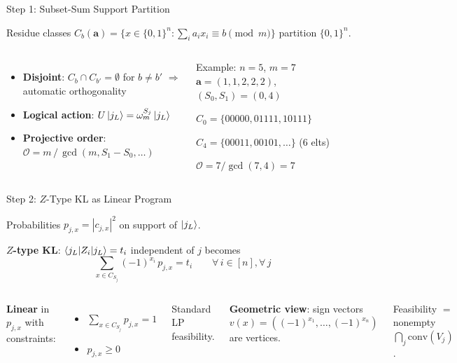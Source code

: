 \documentclass[aspectratio=169,t,10pt]{beamer}
\newcommand{\Fintwo}{\{0,1\}}
\begin{document}
\begin{frame}{Step 1: Subset-Sum Support Partition}

Residue classes
$C_b(\mathbf{a})
  = 
  \bigl\{x\in\Fintwo^n :
    \sum_i a_i x_i \equiv b \pmod{m}\bigr\}$
partition $\Fintwo^n$.

\begin{columns}[T]
\begin{itemize}
\item \textbf{Disjoint}: $C_b\cap C_{b'} = \emptyset$ for $b\neq b'$
  $ \Rightarrow$ automatic orthogonality
\item \textbf{Logical action}:
  $U\ket{j_L} = \omega_m^{S_j}\ket{j_L}$
\item \textbf{Projective order}:
  $\mathcal{O} = m\,/\,\gcd(m,S_1-S_0,\ldots)$
\end{itemize}

\begin{exampleblock}{Example: $n{=}5$, $m{=}7$}
$\mathbf{a}{=}(1,1,2,2,2)$, $(S_0,S_1)=(0,4)$

$C_0 = \{00000, 01111, 10111\}$

$C_4 = \{00011, 00101, \ldots\}$ (6 elts)

$\mathcal{O}=7/\gcd(7,4)=7$
\end{exampleblock}
\end{columns}
\end{frame}

\begin{frame}{Step 2: $Z$-Type KL as Linear Program}

Probabilities $p_{j,x}=|c_{j,x}|^2$ on support of $\ket{j_L}$.

\textbf{$Z$-type KL}: $\braket{j_L|Z_i|j_L}=t_i$ independent of $j$ becomes
\[
  \boxed{ \sum_{x\in C_{S_j}}\! (-1)^{x_i}\, p_{j,x} =  t_i
  \qquad\forall\, i\in[n], \forall\, j }
\]

\begin{columns}[T]
\textbf{Linear} in $p_{j,x}$ with constraints:
\begin{itemize}
\item $\sum_{x\in C_{S_j}} p_{j,x} = 1$
\item $p_{j,x} \geq 0$
\end{itemize}
Standard LP feasibility.

\textbf{Geometric view}: sign vectors
$v(x)=((-1)^{x_1},\ldots,(-1)^{x_n})$
are vertices.

Feasibility $=$ nonempty
$\bigcap_{j}\mathrm{conv}(V_j)$.
\end{columns}
\end{frame}
\end{document}
